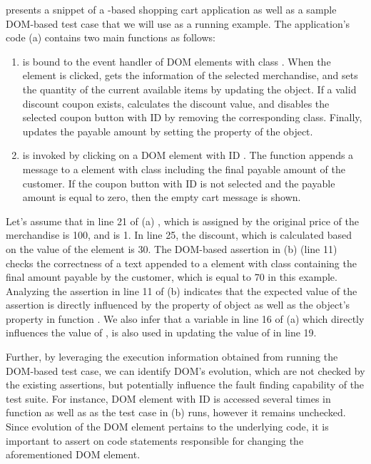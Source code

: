  presents a snippet of a \javascript-based shopping cart application as well as a sample DOM-based \selenium test case that we will use as a running example. The application's code (a) contains two main functions as follows:
\begin{enumerate}
\item {} is bound to the event handler of DOM elements with class . When the element is clicked,  gets the information of the selected merchandise, and sets the quantity of the current available items by updating the  object. If a valid discount coupon exists,  calculates the discount value, and disables the selected  coupon button with ID  by removing the corresponding class. Finally,  updates the payable amount by setting the  property of the  object.
\item {} is invoked by clicking on a DOM element with ID . The function appends a message to a  element with class  including the final payable amount of the customer. If the  coupon button with ID  is not selected and the payable amount is equal to zero, then the empty cart message is shown.    
\end{enumerate}
Let's assume that in line 21 of (a) , which is assigned by the original price of the merchandise is 100, and  is 1. In line 25, the discount, which is calculated based on the  value of the  element is 30. 
The DOM-based assertion in (b) (line 11) checks the correctness of a text appended to a  element with class  containing the final amount payable by the customer, which is equal to 70 in this example.
Analyzing the assertion in line 11 of (b) indicates that the expected value of the assertion is directly influenced by the  property of  object as well as the object's property  in function . We also infer that a variable in line 16 of (a) which directly influences the value of , is also used in updating the value of  in line 19.

Further, by leveraging the execution information obtained from running the DOM-based test case, we can identify DOM's evolution, which are not checked by the existing assertions, but potentially influence the fault finding capability of the test suite. For instance, DOM element with ID  is accessed several times in function  as well as  as the test case in (b) runs, however it remains unchecked. Since evolution of the  DOM element pertains to the underlying \javascript code, it is important to assert on code statements responsible for changing the aforementioned DOM element.             


